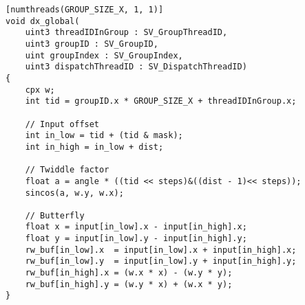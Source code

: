 \begin{lstlisting}
[numthreads(GROUP_SIZE_X, 1, 1)]
void dx_global(
    uint3 threadIDInGroup : SV_GroupThreadID,
    uint3 groupID : SV_GroupID,
    uint groupIndex : SV_GroupIndex,
    uint3 dispatchThreadID : SV_DispatchThreadID)
{
    cpx w;
    int tid = groupID.x * GROUP_SIZE_X + threadIDInGroup.x;
	
    // Input offset
    int in_low = tid + (tid & mask);
    int in_high = in_low + dist;    
    
    // Twiddle factor
    float a = angle * ((tid << steps)&((dist - 1)<< steps));
    sincos(a, w.y, w.x);	
    
    // Butterfly
    float x = input[in_low].x - input[in_high].x;
    float y = input[in_low].y - input[in_high].y;
    rw_buf[in_low].x  = input[in_low].x + input[in_high].x;
    rw_buf[in_low].y  = input[in_low].y + input[in_high].y;
    rw_buf[in_high].x = (w.x * x) - (w.y * y);
    rw_buf[in_high].y = (w.y * x) + (w.x * y);
}
\end{lstlisting}